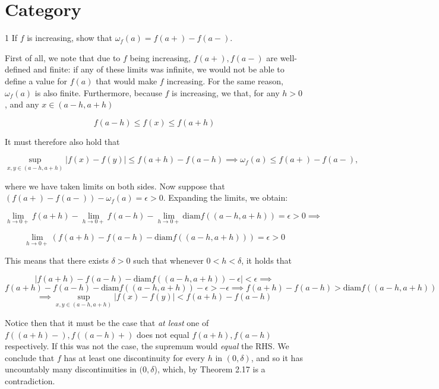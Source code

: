 \chapter{Category}

\begin{exercise}{1}
    If $f$ is increasing, show that $\omega_f(a) = f(a+) - f(a-)$.
\end{exercise}

\begin{solution}

    First of all, we note that due to $f$ being increasing, $f(a+), f(a-)$ are well-defined and finite: if any of these limits was infinite, we would not be able to define a value for $f(a)$ that would make $f$ increasing.
    For the same reason, $\omega_f(a)$ is also finite.
    Furthermore, because $f$ is increasing, we that, for any $h > 0$, and any $x \in (a - h, a+ h)$

    \[f(a - h) \leq f(x) \leq f(a + h)\]
    
    It must therefore also hold that 
    
    \[\sup_{x, y \in (a - h, a + h)} \lvert f(x) - f(y) \rvert \leq f(a + h) - f(a - h) \implies \omega_f(a) \leq f(a+) - f(a-),\]

    where we have taken limits on both sides.
    Now suppose that $(f(a+) - f(a-)) - \omega_f(a) = \epsilon > 0$.
    Expanding the limits, we obtain:

    \[\lim_{h \rightarrow 0+} f(a + h) - \lim_{h \rightarrow 0+} f(a - h) - \lim_{h \rightarrow 0+} \text{diam} f((a - h, a + h)) = \epsilon > 0 \implies\]

    \[\lim_{h \rightarrow 0+}(f(a + h) - f(a - h) - \text{diam}f((a - h, a + h))) = \epsilon > 0\]

    This means that there exists $\delta > 0$ such that whenever $0 < h < \delta$, it holds that

    \[\lvert f(a + h) - f(a - h) - \text{diam}f((a - h, a+ h)) - \epsilon \rvert < \epsilon \implies\]
    \[f(a + h) - f(a - h) - \text{diam}f((a - h, a + h)) - \epsilon > -\epsilon \implies f(a + h) - f(a - h) > \text{diam}f((a - h, a + h))\]
    \[\implies \sup_{x, y \in (a - h, a + h)} \lvert f(x) - f(y) \rvert < f(a + h) - f(a - h)\]

    Notice then that it must be the case that \textit{at least} one of $f((a + h)-), f((a - h)+)$ does not equal $f(a + h), f(a - h)$ respectively.
    If this was not the case, the supremum would \textit{equal} the RHS.
    We conclude that $f$ has at least one discontinuity for every $h$ in $(0, \delta)$, and so it has uncountably many discontinuities in $(0, \delta$), which, by Theorem 2.17 is a contradiction.
\end{solution}

